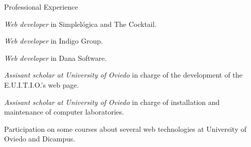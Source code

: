 
\begin{rubric}{Professional Experience}


  \entry*[2008-??]
   \emph{Web developer} in Simplelógica and The Cocktail.

  \entry*[2008-2010]
   \emph{Web developer} in Indigo Group.

  \entry*[2006-2007]
   \emph{Web developer} in Dana Software.

  \entry*[2005-2006]
  \emph{Assisant scholar at University of Oviedo} in charge of the development of the E.U.I.T.I.O.'s web page.

  \entry*[2004-2005]
  \emph{Assisant scholar at University of Oviedo} in charge of installation and maintenance of computer laboratories.



  \entry*[2008-2010]
  Participation on some courses about several web technologies at University of Oviedo and Dicampus.

\end{rubric}

